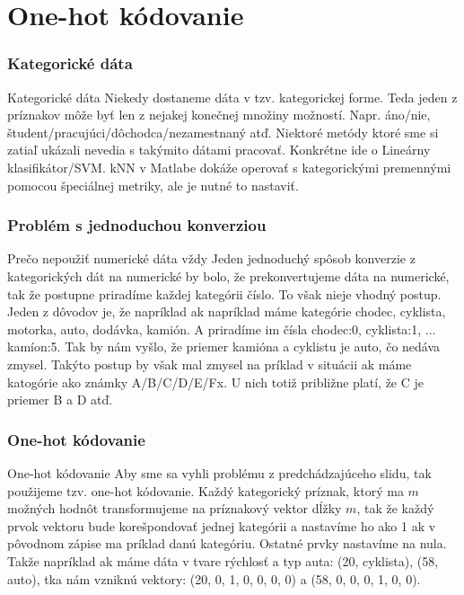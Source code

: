 \documentclass{beamer}
\begin{document}
\section{One-hot kódovanie}

\begin{frame}
\frametitle{Kategorické dáta}

\begin{block}{Kategorické dáta}
Niekedy dostaneme dáta v tzv. kategorickej forme. Teda jeden z príznakov môže byť len z nejakej konečnej množiny možností. Napr. áno/nie, študent/pracujúci/dôchodca/nezamestnaný atď. Niektoré metódy ktoré sme si zatiaľ ukázali nevedia s takýmito dátami pracovať. Konkrétne ide o Lineárny klasifikátor/SVM. kNN v Matlabe dokáže operovať s kategorickými premennými pomocou špeciálnej metriky, ale je nutné to nastaviť.
\end{block}
\end{frame}

\begin{frame}
\frametitle{Problém s jednoduchou konverziou}

\begin{block}{Prečo nepoužiť numerické dáta vždy}
Jeden jednoduchý spôsob konverzie z kategorických dát na numerické by bolo, že prekonvertujeme dáta na numerické, tak že postupne priradíme každej kategórii číslo. To však nieje vhodný postup. Jeden z dôvodov je, že napríklad ak napríklad máme kategórie chodec, cyklista, motorka, auto, dodávka, kamión. A priradíme im čísla chodec:0, cyklista:1, ... kamíon:5. Tak by nám vyšlo, že priemer kamióna a cyklistu je auto, čo nedáva zmysel. Takýto postup by však mal zmysel na príklad v situácii ak máme katogórie ako známky A/B/C/D/E/Fx. U nich totiž približne platí, že C je priemer B a D atď.
\end{block}
\end{frame}

\begin{frame}
\frametitle{One-hot kódovanie}
\begin{block}{One-hot kódovanie}
Aby sme sa vyhli problému z predchádzajúceho slidu, tak použijeme tzv. one-hot kódovanie. Každý kategorický príznak, ktorý ma $m$ možných hodnôt transformujeme na príznakový vektor dĺžky $m$, tak že každý prvok vektoru bude korešpondovať jednej kategórii a nastavíme ho ako 1 ak v pôvodnom zápise ma príklad danú kategóriu. Ostatné prvky nastavíme na nula. Takže napríklad ak máme dáta v tvare rýchlosť a typ auta: (20, cyklista), (58, auto), tka nám vzniknú vektory: (20, 0, 1, 0, 0, 0, 0) a (58, 0, 0, 0, 1, 0, 0).
\end{block}
\end{frame}
\end{document}
